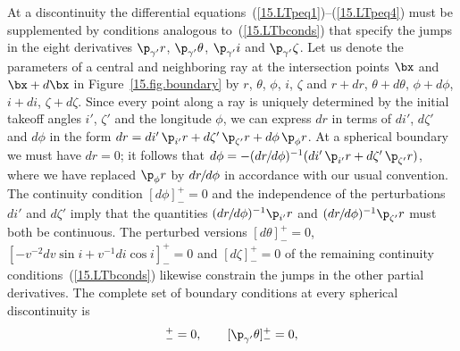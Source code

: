 At a discontinuity the differential
equations~(\ref{15.LTpeq1})--(\ref{15.LTpeq4})
must be supplemented by conditions analogous
to~(\ref{15.LTbconds}) that specify the jumps in the
eight derivatives $\p_{\gamma'}r$, $\p_{\gamma'}\theta$,
$\p_{\gamma'}i$ and $\p_{\gamma'}\zeta$.  Let us
denote the parameters of a central and neighboring ray
at the intersection points $\bx$ and $\bx+d\bx$ in
Figure~\ref{15.fig.boundary} by $r$,
$\theta$, $\phi$, $i$, $\zeta$ and $r+dr$,
$\theta+d\theta$, $\phi+d\phi$, $i+di$,
$\zeta+d\zeta$.  Since every point along
a ray is uniquely determined by the initial
takeoff angles $i'$, $\zeta'$ and the longitude
$\phi$, we can express $dr$
in terms of $di'$, $d\zeta'$ and $d\phi$ in the form
$dr=di'\,\p_{i'}r+d\zeta'\,\p_{\zeta'}r+d\phi\,\p_{\phi}r$.
At a spherical boundary we must have $dr=0$;
it follows that $d\phi=-(dr\hspace{-0.3 mm}/\hspace{-0.3 mm}d\phi)^{-1}
(di'\,\p_{i'}r+d\zeta'\,\p_{\zeta'}r)$,
where we have replaced $\p_{\phi}r$ by
$dr\hspace{-0.3 mm}/\hspace{-0.3 mm}d\phi$
in accordance with our usual convention.
The continuity condition $[d\phi]^+_-=0$ and
the independence of the perturbations $di'$
and $d\zeta'$ imply that the quantities
$(dr\hspace{-0.3 mm}/\hspace{-0.3 mm}d\phi)^{-1}\p_{i'}r$
and $(dr\hspace{-0.3 mm}/\hspace{-0.3 mm}d\phi)^{-1}\p_{\zeta'}r$
must both be continuous.  The perturbed versions $[d\theta]^+_-=0$,
$[-v^{-2}dv\sin i+v^{-1}di\cos i]^+_-=0$ and $[d\zeta]^+_-=0$
of the remaining continuity conditions~(\ref{15.LTbconds})
likewise constrain the jumps in the other partial derivatives.
The complete set of boundary conditions at every spherical
discontinuity is
\begin{displaymath}
[(dr\hspace{-0.3 mm}/\hspace{-0.3 mm}d\phi)^{-1}\p_{\gamma'}r]^+_-=0,\qquad
[\p_{\gamma'}\theta]^+_-=0,
\end{displaymath}
\vspace{-3.0 mm}
\eqa \lefteqn{
[\cot i\,\p_{\gamma'}i-(\p_{\theta}\hspace{-0.4 mm}\ln v)\,\p_{\gamma'}\theta
+(dr\hspace{-0.3 mm}/\hspace{-0.3 mm}d\phi)^{-1}}
\nonumber \\
